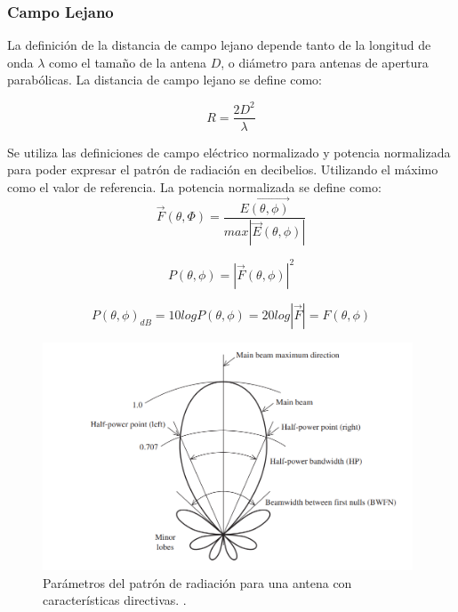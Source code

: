 \subsubsection*{Campo Lejano} La definición de la distancia de campo lejano depende tanto de la longitud de onda $\lambda$ como el tamaño de la antena $D$, o diámetro para antenas de apertura parabólicas. La distancia de campo lejano se define como:

\begin{equation}
    R = \frac{2D^2}{\lambda}
\end{equation}

Se utiliza las definiciones de campo eléctrico normalizado y potencia normalizada para poder expresar el patrón de radiación en decibelios. Utilizando el máximo como el valor de referencia. La potencia normalizada se define como:\\

\begin{equation}
    \Vec{F}(\theta, \Phi)=\frac{\Vec{E(\theta, \phi)}}{max|\Vec{E}(\theta, \phi)|}
\end{equation}

\begin{equation}
    P(\theta, \phi) = |\Vec{F}(\theta, \phi)|^{2}
\end{equation}

\begin{equation}
    P(\theta, \phi)_{dB} = 10logP(\theta, \phi)=20log |\Vec{F}|=F(\theta, \phi)
\end{equation}


\begin{figure}
    \centering
    \includegraphics[width = 11cm]{img/patern1.png}
    \caption{Parámetros del patrón de radiación para una antena con características directivas. \cite{stutzman2012antenna}.}
    \label{fig:patern}
\end{figure}

